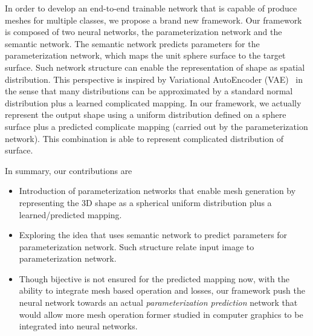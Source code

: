In order to develop an end-to-end trainable network that is capable of produce meshes for multiple classes, we propose a brand new framework. 
Our framework is composed of two neural networks, the parameterization network and the semantic network.
The semantic network predicts parameters for the parameterization network, which maps the unit sphere surface to the target surface. 
Such network structure can enable the representation of shape as spatial distribution. 
This perspective is inspired by Variational AutoEncoder (VAE)~\cite{VAE} in the sense that many distributions can be approximated by a standard normal distribution plus a learned complicated mapping. 
In our framework, we actually represent the output shape using a uniform distribution defined on a sphere surface plus a predicted complicate mapping (carried out by the parameterization network). 
This combination is able to represent complicated distribution of surface. 


In summary, our contributions are
\begin{itemize}
	\item  Introduction of parameterization networks that enable mesh generation by representing the 3D shape as a spherical uniform distribution plus a learned/predicted mapping.
	\item  Exploring the idea that uses semantic network to predict parameters for parameterization network. Such structure relate input image to parameterization network.
	\item Though bijective is not ensured for the predicted mapping now, with the ability to integrate mesh based operation and losses, our framework push the neural network towards an actual \emph{parameterization prediction} network that would allow more mesh operation former studied in computer graphics to be integrated into neural networks.
\end{itemize}          

